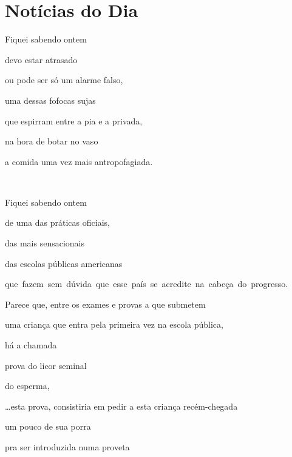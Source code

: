 

\chapter{Notícias do Dia}



Fiquei sabendo ontem

devo estar atrasado

ou pode ser só um alarme falso,

uma dessas fofocas sujas

que espirram entre a pia e a privada, 

na hora de botar no vaso

a comida uma vez mais antropofagiada.

~

Fiquei sabendo ontem

de uma das práticas oficiais, 

das mais sensacionais

das escolas públicas americanas

\mbox{que fazem sem dúvida que esse país se acredite na cabeça do progresso.}

Parece que, entre os exames e provas a que submetem

uma criança que entra pela primeira vez na escola pública, 

há a chamada

prova do licor seminal

do esperma,


\ldots{}esta prova, consistiria em pedir a esta criança recém-chegada

um pouco de sua porra

pra ser introduzida numa proveta

